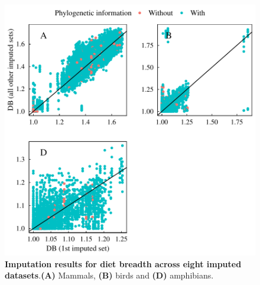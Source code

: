 \documentclass[11pt]{article}
\begin{document}
\begin{figure}[h!]
\centering
\includegraphics[scale=0.6]{figures/Congruence_continuous_traits/DB}
\caption[Imputation results for diet breadth across eight imputed datasets]{\textbf{Imputation results for diet breadth across eight imputed datasets}.\textbf{(A)} Mammals, \textbf{(B)} birds and \textbf{(D)} amphibians.}
\label{congruenceDB}
\end{figure}

\pagebreak
\end{document}
